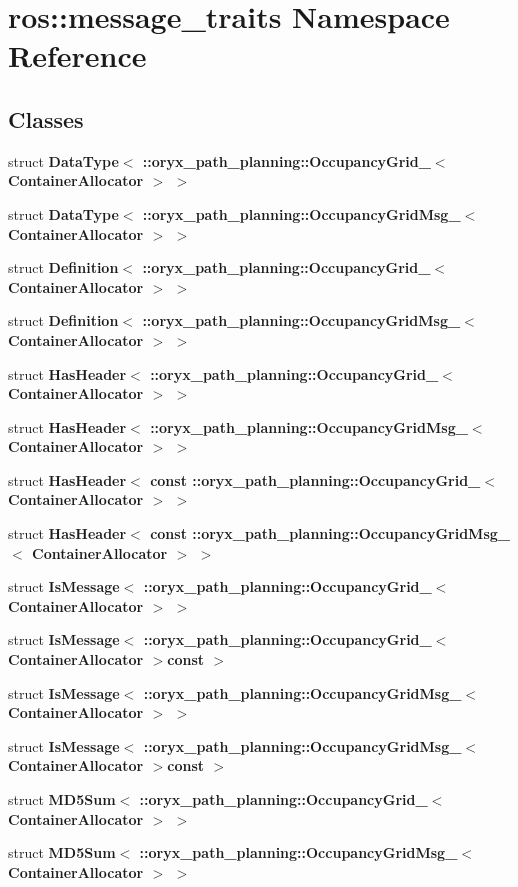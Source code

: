 \section{ros\-:\-:message\-\_\-traits \-Namespace \-Reference}
\label{namespaceros_1_1message__traits}
\subsection*{\-Classes}
\begin{DoxyCompactItemize}
\item 
struct {\bf \-Data\-Type$<$ \-::oryx\-\_\-path\-\_\-planning\-::\-Occupancy\-Grid\-\_\-$<$ Container\-Allocator $>$ $>$}
\item 
struct {\bf \-Data\-Type$<$ \-::oryx\-\_\-path\-\_\-planning\-::\-Occupancy\-Grid\-Msg\-\_\-$<$ Container\-Allocator $>$ $>$}
\item 
struct {\bf \-Definition$<$ \-::oryx\-\_\-path\-\_\-planning\-::\-Occupancy\-Grid\-\_\-$<$ Container\-Allocator $>$ $>$}
\item 
struct {\bf \-Definition$<$ \-::oryx\-\_\-path\-\_\-planning\-::\-Occupancy\-Grid\-Msg\-\_\-$<$ Container\-Allocator $>$ $>$}
\item 
struct {\bf \-Has\-Header$<$ \-::oryx\-\_\-path\-\_\-planning\-::\-Occupancy\-Grid\-\_\-$<$ Container\-Allocator $>$ $>$}
\item 
struct {\bf \-Has\-Header$<$ \-::oryx\-\_\-path\-\_\-planning\-::\-Occupancy\-Grid\-Msg\-\_\-$<$ Container\-Allocator $>$ $>$}
\item 
struct {\bf \-Has\-Header$<$ const \-::oryx\-\_\-path\-\_\-planning\-::\-Occupancy\-Grid\-\_\-$<$ Container\-Allocator $>$ $>$}
\item 
struct {\bf \-Has\-Header$<$ const \-::oryx\-\_\-path\-\_\-planning\-::\-Occupancy\-Grid\-Msg\-\_\-$<$ Container\-Allocator $>$ $>$}
\item 
struct {\bf \-Is\-Message$<$ \-::oryx\-\_\-path\-\_\-planning\-::\-Occupancy\-Grid\-\_\-$<$ Container\-Allocator $>$ $>$}
\item 
struct {\bf \-Is\-Message$<$ \-::oryx\-\_\-path\-\_\-planning\-::\-Occupancy\-Grid\-\_\-$<$ Container\-Allocator $>$const  $>$}
\item 
struct {\bf \-Is\-Message$<$ \-::oryx\-\_\-path\-\_\-planning\-::\-Occupancy\-Grid\-Msg\-\_\-$<$ Container\-Allocator $>$ $>$}
\item 
struct {\bf \-Is\-Message$<$ \-::oryx\-\_\-path\-\_\-planning\-::\-Occupancy\-Grid\-Msg\-\_\-$<$ Container\-Allocator $>$const  $>$}
\item 
struct {\bf \-M\-D5\-Sum$<$ \-::oryx\-\_\-path\-\_\-planning\-::\-Occupancy\-Grid\-\_\-$<$ Container\-Allocator $>$ $>$}
\item 
struct {\bf \-M\-D5\-Sum$<$ \-::oryx\-\_\-path\-\_\-planning\-::\-Occupancy\-Grid\-Msg\-\_\-$<$ Container\-Allocator $>$ $>$}
\end{DoxyCompactItemize}

